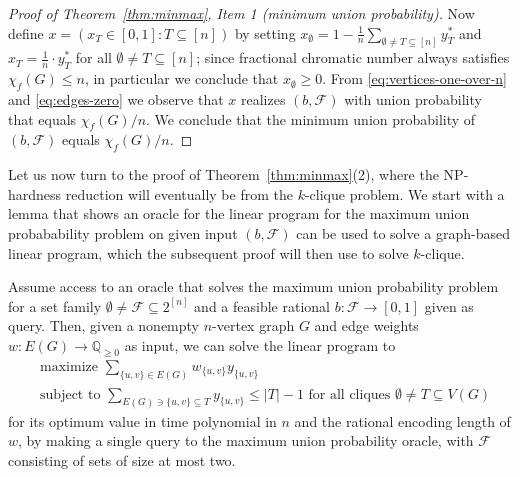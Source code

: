 \documentclass[11pt]{article}
\begin{document}
\begin{proof}[Proof of Theorem~\ref{thm:minmax}, Item 1 (minimum union probability)]
Now define $x=(x_T\in[0,1]:T\subseteq [n])$ by setting 
$x_\emptyset=1-\frac{1}{n}\sum_{\emptyset\neq T\subseteq[n]}y_T^*$
and $x_T=\frac{1}{n}\cdot y_T^*$ for all $\emptyset\neq T\subseteq[n]$;
since fractional chromatic number always satisfies $\chi_f(G)\leq n$,
in particular we conclude that $x_\emptyset\geq 0$. 
From \eqref{eq:vertices-one-over-n} and 
\eqref{eq:edges-zero}
we observe that $x$ realizes $(b,\mathcal{F})$ with union probability
that equals $\chi_f(G)/n$.
We conclude that the minimum union probability of $(b,\mathcal{F})$ 
equals $\chi_f(G)/n$.
\end{proof}


Let us now turn to the proof of Theorem~\ref{thm:minmax}(2), where
the NP-hardness reduction will eventually be from the $k$-clique problem. 
We start with a lemma that shows an oracle for the linear program for 
the maximum union probabability problem on given input $(b,\mathcal{F})$ 
can be used to solve a graph-based linear program, which the subsequent 
proof will then use to solve $k$-clique.


\begin{lemma}
\label{lem:special-dual}
Assume access to an oracle that solves the maximum union
probability problem for a set family $\emptyset\neq\mathcal{F}\subseteq2^{[n]}$ 
and a feasible rational $b:\mathcal{F}\rightarrow [0,1]$ given as query.
Then, given a nonempty $n$-vertex graph $G$ and edge weights
$w:E(G)\rightarrow\mathbb{Q}_{\geq 0}$
as input, we can solve the linear program to
\begin{equation}
\label{eq:dual-simplified}
\begin{split}
&\text{maximize $\sum_{\{u,v\}\in E(G)}w_{\{u,v\}}y_{\{u,v\}}$}\\
&\text{subject to $\sum_{E(G)\ni \{u,v\}\subseteq T}y_{\{u,v\}}\leq |T|-1$ 
for all cliques $\emptyset\neq T\subseteq V(G)$}
\end{split}
\end{equation}
for its optimum value in time polynomial in $n$ and the rational encoding 
length of $w$, by making a single query to the maximum union probability 
oracle, with $\mathcal{F}$ consisting of sets of size at most two.
\end{lemma}
\end{document}
